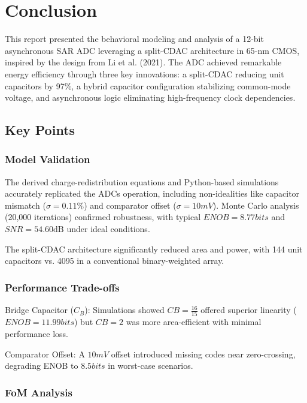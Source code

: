 \section{Conclusion}
\label{sec:conclusion}

This report presented the behavioral modeling and analysis of a 12-bit asynchronous SAR ADC leveraging a split-CDAC architecture in 65-nm CMOS, inspired by the design from Li et al. (2021). The ADC achieved remarkable energy efficiency through three key innovations: a split-CDAC reducing unit capacitors by 97\%, a hybrid capacitor configuration stabilizing common-mode voltage, and asynchronous logic eliminating high-frequency clock dependencies.

\subsection{Key Points}

\subsubsection{Model Validation}

The derived charge-redistribution equations and Python-based simulations accurately replicated the ADCs operation, including non-idealities like capacitor mismatch ($\sigma=0.11\%$) and comparator offset ($\sigma=10 mV$). Monte Carlo analysis (20,000 iterations) confirmed robustness, with typical $ENOB = 8.77 \si{bits}$ and $SNR = 54.60 \si{\dB}$ under ideal conditions.

The split-CDAC architecture significantly reduced area and power, with 144 unit capacitors vs. 4095 in a conventional binary-weighted array.

\subsubsection{Performance Trade-offs}

Bridge Capacitor ($C_B$): Simulations showed $CB=\frac{16}{15}$ offered superior linearity ($ENOB = 11.99 bits$) but $CB=2$ was more area-efficient with minimal performance loss.

Comparator Offset: A $10 mV$ offset introduced missing codes near zero-crossing, degrading ENOB to $8.5 bits$ in worst-case scenarios.

\subsubsection{FoM Analysis}

